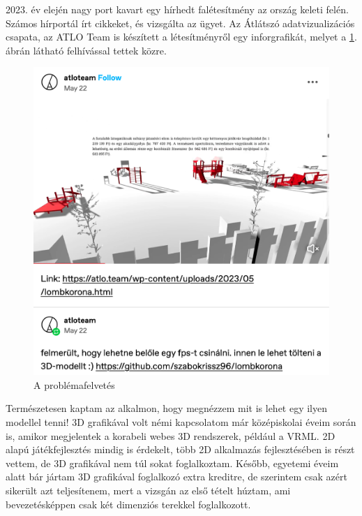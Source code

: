 \documentclass[a5paper,10pt]{article}
\begin{document}
2023. év elején nagy port kavart egy hírhedt falétesítmény az ország keleti felén\cite{lombkorona}. Számos hírportál írt cikkeket, és vizsgálta az ügyet. Az Átlátszó adatvizualizációs csapata, az ATLO Team is készített a létesítményről egy inforgrafikát, melyet a \ref{atloteam:question}. ábrán látható felhívással tettek közre\cite{atloteam:tumblr}.

\bigskip

\begin{figure}[!htbp]
    \centering
    \includegraphics[width=\textwidth]{images/atlo_kerdes.png}
    \EndAccSupp{}%
    \caption{A problémafelvetés}
    \label{atloteam:question}
\end{figure}

Természetesen kaptam az alkalmon, hogy megnézzem mit is lehet egy ilyen modellel tenni! 3D grafikával volt némi kapcsolatom már középiskolai éveim során is, amikor megjelentek a korabeli webes 3D rendszerek, például a VRML. 2D alapú játékfejlesztés mindig is érdekelt, több 2D alkalmazás fejlesztésében is részt vettem, de 3D grafikával nem túl sokat foglalkoztam. Később, egyetemi éveim alatt bár jártam 3D grafikával foglalkozó extra kreditre, de szerintem csak azért sikerült azt teljesítenem, mert a vizsgán az első tételt húztam, ami bevezetésképpen csak két dimenziós terekkel foglalkozott.
\end{document}
